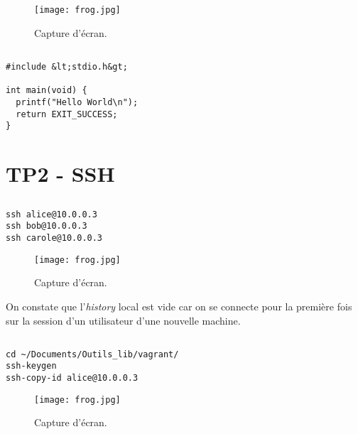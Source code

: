 \documentclass{article}
\begin{document}
\subsection{}

\begin{figure}[h]
\centering
\texttt{[image: frog.jpg]}
\caption{\label{fig:frog}Capture d'écran.}
\end{figure}

\subsection{}
\begin{lstlisting}
#include &lt;stdio.h&gt;

int main(void) {
  printf("Hello World\n");
  return EXIT_SUCCESS;
}
\end{lstlisting}


\section{TP2 - SSH}

\subsection{}

\begin{lstlisting}
ssh alice@10.0.0.3
ssh bob@10.0.0.3
ssh carole@10.0.0.3
\end{lstlisting}

\begin{figure}[h]
\centering
\texttt{[image: frog.jpg]}
\caption{\label{fig:frog}Capture d'écran.}
\end{figure}

On constate que l'\emph{history} local est vide car on se connecte pour la première fois sur la session d'un utilisateur d'une nouvelle machine.

\subsection{}

\begin{lstlisting}
cd ~/Documents/Outils_lib/vagrant/
ssh-keygen
ssh-copy-id alice@10.0.0.3
\end{lstlisting}

\begin{figure}[h]
\centering
\texttt{[image: frog.jpg]}
\caption{\label{fig:frog}Capture d'écran.}
\end{figure}
\end{document}
